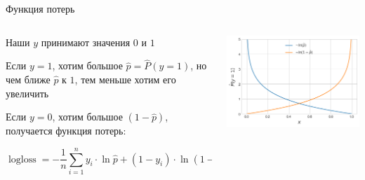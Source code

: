 \documentclass[notes,12pt, aspectratio=169]{beamer}
\newenvironment{wideitemize}{\itemize\addtolength{\itemsep}{10pt}}{\enditemize}
\DeclareMathOperator{\logloss}{logloss}
\begin{document}
\begin{frame}{Функция потерь}
	\begin{columns}[T] %
	\begin{column}{.5\textwidth}
		\begin{wideitemize}
			\item Наши $y$ принимают значения $0$ и $1$ 
			\item Если $y = 1$, хотим большое $\hat p = \hat P(y = 1)$, но чем ближе $\hat p$ к $1$, тем меньше хотим его увеличить 
			\item Если $y = 0$, хотим большое $(1 - \hat p)$, получается функция потерь: 
			
			$$
			\logloss = - \frac{1}{n} \sum_{i=1}^n y_i \cdot \ln \hat p + (1 - y_i) \cdot \ln (1 - \hat p)
			$$
		\end{wideitemize}	
	\end{column}%
	\hfill%
	\begin{column}{.5\textwidth}
		\begin{center}
			\includegraphics[width= 0.95\linewidth]{log_loss_05.png}
		\end{center}
	\end{column}%
\end{columns}
\end{frame}
\end{document}
